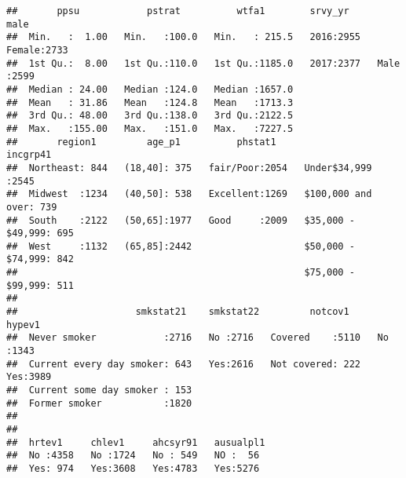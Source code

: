 \documentclass[]{article}
\newenvironment{Shaded}{\begin{snugshade}}{\end{snugshade}}
\newcommand{\CommentTok}[1]{\textcolor[rgb]{0.56,0.35,0.01}{\textit{#1}}}
\newcommand{\KeywordTok}[1]{\textcolor[rgb]{0.13,0.29,0.53}{\textbf{#1}}}
\newcommand{\NormalTok}[1]{#1}
\newcommand{\OperatorTok}[1]{\textcolor[rgb]{0.81,0.36,0.00}{\textbf{#1}}}
\newcommand{\StringTok}[1]{\textcolor[rgb]{0.31,0.60,0.02}{#1}}
\begin{document}
\begin{Shaded}
\end{Shaded}

\begin{verbatim}
##       ppsu            pstrat          wtfa1        srvy_yr         male     
##  Min.   :  1.00   Min.   :100.0   Min.   : 215.5   2016:2955   Female:2733  
##  1st Qu.:  8.00   1st Qu.:110.0   1st Qu.:1185.0   2017:2377   Male  :2599  
##  Median : 24.00   Median :124.0   Median :1657.0                            
##  Mean   : 31.86   Mean   :124.8   Mean   :1713.3                            
##  3rd Qu.: 48.00   3rd Qu.:138.0   3rd Qu.:2122.5                            
##  Max.   :155.00   Max.   :151.0   Max.   :7227.5                            
##       region1         age_p1          phstat1                  incgrp41   
##  Northeast: 844   (18,40]: 375   fair/Poor:2054   Under$34,999     :2545  
##  Midwest  :1234   (40,50]: 538   Excellent:1269   $100,000 and over: 739  
##  South    :2122   (50,65]:1977   Good     :2009   $35,000 - $49,999: 695  
##  West     :1132   (65,85]:2442                    $50,000 - $74,999: 842  
##                                                   $75,000 - $99,999: 511  
##                                                                           
##                     smkstat21    smkstat22         notcov1     hypev1    
##  Never smoker            :2716   No :2716   Covered    :5110   No :1343  
##  Current every day smoker: 643   Yes:2616   Not covered: 222   Yes:3989  
##  Current some day smoker : 153                                           
##  Former smoker           :1820                                           
##                                                                          
##                                                                          
##  hrtev1     chlev1     ahcsyr91   ausualpl1 
##  No :4358   No :1724   No : 549   NO :  56  
##  Yes: 974   Yes:3608   Yes:4783   Yes:5276  

\end{verbatim}
\end{document}

